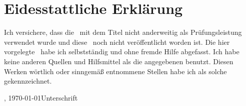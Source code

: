 
\chapter*{Eidesstattliche Erklärung}
\label{sec:EidesstattlicheErklärung}

Ich versichere, dass die \arbeit\ mit dem Titel \glqq{}\titel\grqq{} nicht
anderweitig als Prüfungsleistung verwendet wurde und diese \arbeit\ noch
nicht veröffentlicht worden ist. Die hier vorgelegte \arbeit\ habe ich
selbstständig und ohne fremde Hilfe abgefasst. Ich habe keine anderen Quellen und Hilfsmittel als die angegebenen benutzt. Diesen Werken wörtlich oder sinngemäß entnommene Stellen habe ich als solche gekennzeichnet.
\vfill

\begin{center}
\begin{minipage}{0.9\textwidth}
\ort, \today \hfill  Unterschrift
\end{minipage}
\end{center}



